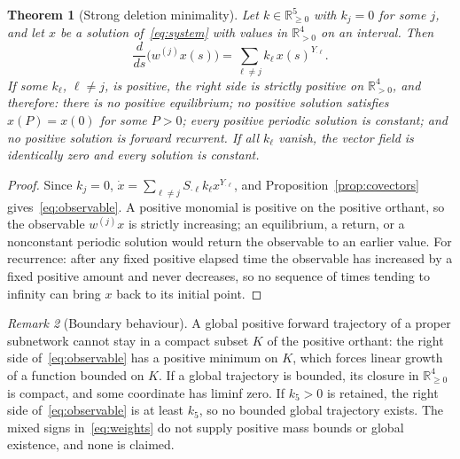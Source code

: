 \documentclass[11pt,a4paper]{article}
\theoremstyle{plain}
\newtheorem{theorem}{Theorem}[section]
\theoremstyle{definition}
\theoremstyle{remark}
\newtheorem{remark}[theorem]{Remark}
\newcommand{\R}{\mathbb{R}}
\begin{document}
\begin{theorem}[Strong deletion minimality]\label{thm:deletion}
Let $k\in\R_{\ge0}^5$ with $k_j=0$ for some $j$, and let $x$ be a solution of~\eqref{eq:system} with values in $\R_{>0}^4$ on an interval. Then
\begin{equation}\label{eq:observable}
\frac{d}{ds}\bigl(w^{(j)}x(s)\bigr)=\sum_{\ell\ne j}k_\ell\,x(s)^{Y_{\cdot\ell}} .
\end{equation}
If some $k_\ell$, $\ell\neq j$, is positive, the right side is strictly positive on $\R_{>0}^4$, and therefore: there is no positive equilibrium; no positive solution satisfies $x(P)=x(0)$ for some $P>0$; every positive periodic solution is constant; and no positive solution is forward recurrent. If all $k_\ell$ vanish, the vector field is identically zero and every solution is constant.
\end{theorem}

\begin{proof}
Since $k_j=0$, $\dot x=\sum_{\ell\ne j}S_{\cdot\ell}k_\ell x^{Y_{\cdot\ell}}$, and Proposition~\ref{prop:covectors} gives~\eqref{eq:observable}. A positive monomial is positive on the positive orthant, so the observable $w^{(j)}x$ is strictly increasing; an equilibrium, a return, or a nonconstant periodic solution would return the observable to an earlier value. For recurrence: after any fixed positive elapsed time the observable has increased by a fixed positive amount and never decreases, so no sequence of times tending to infinity can bring $x$ back to its initial point.
\end{proof}

\begin{remark}[Boundary behaviour]
A global positive forward trajectory of a proper subnetwork cannot stay in a compact subset $K$ of the positive orthant: the right side of~\eqref{eq:observable} has a positive minimum on $K$, which forces linear growth of a function bounded on $K$. If a global trajectory is bounded, its closure in $\R_{\ge0}^4$ is compact, and some coordinate has liminf zero. If $k_5>0$ is retained, the right side of~\eqref{eq:observable} is at least $k_5$, so no bounded global trajectory exists. The mixed signs in~\eqref{eq:weights} do not supply positive mass bounds or global existence, and none is claimed.
\end{remark}
\end{document}
